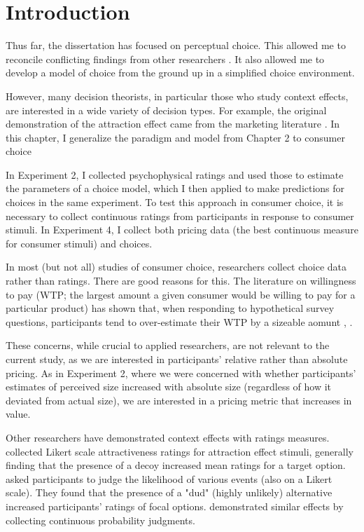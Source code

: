 \section{Introduction}
Thus far, the dissertation has focused on perceptual choice. This allowed me to reconcile conflicting findings from other researchers \parencite{spektorWhenGoodLooks2018b,trueblood2013not}. It also allowed me to develop a model of choice from the ground up in a simplified choice environment.

However, many decision theorists, in particular those who study context effects, are interested in a wide variety of decision types. For example, the original demonstration of the attraction effect came from the marketing literature \parencite{huberAddingAsymmetricallyDominated1982d}. In this chapter, I generalize the paradigm and model from Chapter 2 to consumer choice

In Experiment 2, I collected psychophysical ratings and used those to estimate the parameters of a choice model, which I then applied to make predictions for choices in the same experiment. To test this approach in consumer choice, it is necessary to collect continuous ratings from participants in response to consumer stimuli. In Experiment 4, I collect both pricing data (the best continuous measure for consumer stimuli) and choices.

In most (but not all) studies of consumer choice, researchers collect choice data rather than ratings. There are good reasons for this. The literature on willingness to pay (WTP; the largest amount a given consumer would be willing to pay for a particular product) has shown that, when responding to hypothetical survey questions, participants tend to over-estimate their WTP by a sizeable aomunt \parencite{breidertREVIEWMETHODSMEASURING2006,schmidtAccuratelyMeasuringWillingness2020}, \parencite[c.f.~]{miller2011should}. 

These concerns, while crucial to applied researchers, are not relevant to the current study, as we are interested in participants' relative rather than absolute pricing. As in Experiment 2, where we were concerned with whether participants' estimates of perceived size increased with absolute size (regardless of how it deviated from actual size), we are interested in a pricing metric that increases in value. 

Other researchers have demonstrated context effects with ratings measures. \textcite{wedellUsingJudgmentsUnderstand} collected Likert scale attractiveness ratings for attraction effect stimuli, generally finding that the presence of a decoy increased mean ratings for a target option. \textcite{windschitl2004dud} asked participants to judge the likelihood of various events (also on a Likert scale). They found that the presence of a "dud" (highly unlikely) alternative increased participants' ratings of focal options. \textcite{caiWhenAlternativeHypotheses2023} demonstrated similar effects by collecting continuous probability judgments.

